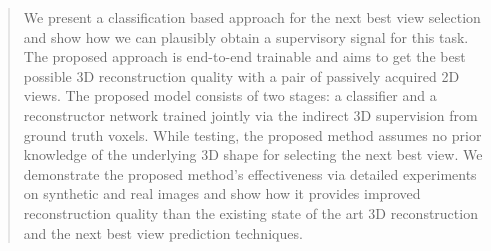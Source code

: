 


\begin{abstract}

We present a classification based approach for the next best view selection and show how we can plausibly obtain a supervisory signal for this task. The proposed approach is end-to-end trainable and aims to get the best possible 3D reconstruction quality with a pair of passively acquired 2D views. The proposed model consists of two stages: a classifier and a reconstructor network trained jointly via the indirect 3D supervision from ground truth voxels. While testing, the proposed method assumes no prior knowledge of the underlying 3D shape for selecting the next best view. We demonstrate the proposed method's effectiveness via detailed experiments on synthetic and real images and show how it provides improved reconstruction quality than the existing state of the art 3D reconstruction and the next best view prediction techniques.
\end{abstract}


